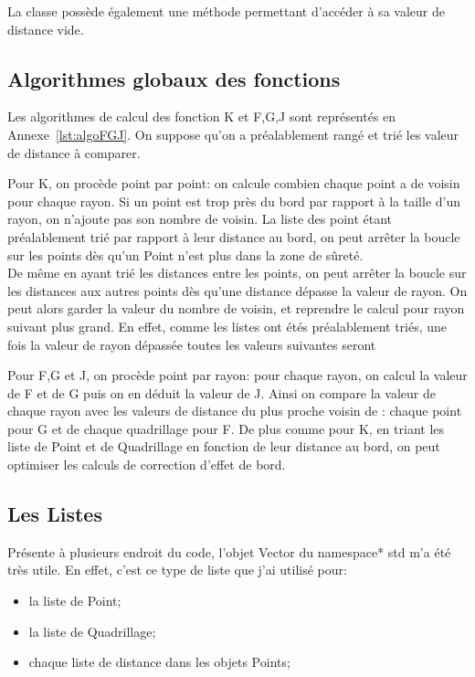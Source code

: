 \documentclass[stage2a]{tnreport}
\begin{document}
La classe possède également une méthode permettant d'accéder à sa valeur de distance vide.

\subsection{Algorithmes globaux des fonctions}
Les algorithmes de calcul des fonction K et F,G,J sont représentés en Annexe~\ref{lst:algoFGJ}. On suppose qu'on a préalablement rangé et trié les valeur de distance à comparer.

Pour K, on procède point par point: on calcule combien chaque point a de voisin pour chaque rayon. Si un point est trop près du bord par rapport à la taille d'un rayon, on n'ajoute pas son nombre de voisin. La liste des point étant préalablement trié par rapport à leur distance au bord, on peut arrêter la boucle sur les points dès qu'un Point n'est plus dans la zone de sûreté.\\
De même en ayant trié les distances entre les points, on peut arrêter la boucle sur les distances aux autres points dès qu'une distance dépasse la valeur de rayon. On peut alors garder la valeur du nombre de voisin, et reprendre le calcul pour rayon suivant plus grand.
En effet, comme les listes ont étés préalablement triés, une fois la valeur de rayon dépassée toutes les valeurs suivantes seront 

Pour F,G et J, on procède point par rayon: pour chaque rayon, on calcul la valeur de F et de G puis on en déduit la valeur de J. Ainsi on compare la valeur de chaque rayon avec les valeurs de distance du plus proche voisin de : chaque point pour G et de chaque quadrillage pour F. De plus comme pour K, en triant les liste de Point et de Quadrillage en fonction de leur distance au bord, on peut optimiser les calculs de correction d'effet de bord.

\subsection{Les Listes}

Présente à plusieurs endroit du code, l'objet Vector du \gls{namespace}* std m'a été très utile. En effet, c'est ce type de liste que j'ai utilisé pour:
\begin{itemize}
\item la liste de Point;
\item la liste de Quadrillage;
\item chaque liste de distance dans les objets Points;\\
\end{itemize}
\end{document}
